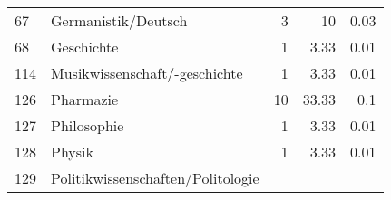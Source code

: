 \begin{longtable}{lXrrr}
     67 &
     \multicolumn{1}{X}{ Germanistik/Deutsch   } &


       \num{3} &
       \num[round-mode=places,round-precision=2]{10} &
         \num[round-mode=places,round-precision=2]{0.03} \\

     68 &
     \multicolumn{1}{X}{ Geschichte   } &


       \num{1} &
       \num[round-mode=places,round-precision=2]{3.33} &
         \num[round-mode=places,round-precision=2]{0.01} \\

     114 &
     \multicolumn{1}{X}{ Musikwissenschaft/-geschichte   } &


       \num{1} &
       \num[round-mode=places,round-precision=2]{3.33} &
         \num[round-mode=places,round-precision=2]{0.01} \\

     126 &
     \multicolumn{1}{X}{ Pharmazie   } &


       \num{10} &
       \num[round-mode=places,round-precision=2]{33.33} &
         \num[round-mode=places,round-precision=2]{0.1} \\

     127 &
     \multicolumn{1}{X}{ Philosophie   } &


       \num{1} &
       \num[round-mode=places,round-precision=2]{3.33} &
         \num[round-mode=places,round-precision=2]{0.01} \\

     128 &
     \multicolumn{1}{X}{ Physik   } &


       \num{1} &
       \num[round-mode=places,round-precision=2]{3.33} &
         \num[round-mode=places,round-precision=2]{0.01} \\

     129 &
     \multicolumn{1}{X}{ Politikwissenschaften/Politologie   } &



\end{longtable}
